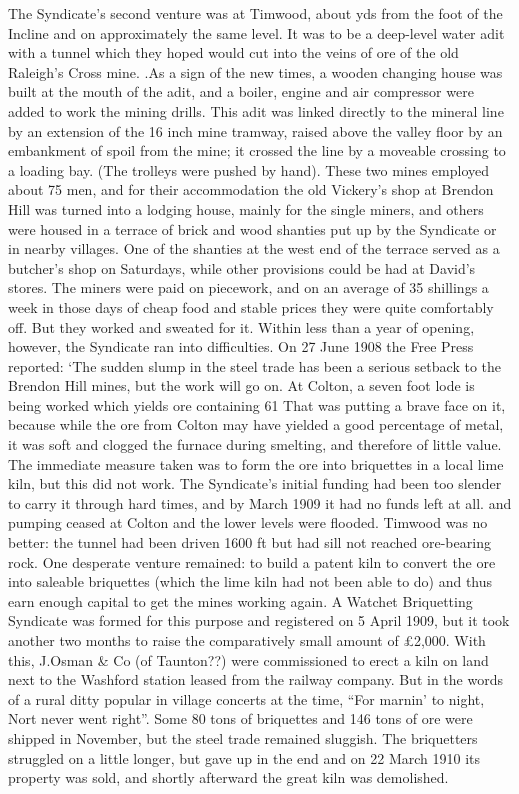 \documentclass[11pt]{book}
\begin{document}
   The Syndicate’s second venture was at Timwood, about       yds from the foot of the Incline and on approximately the same level. It was to be a deep-level water adit with a tunnel which they hoped would cut into the veins of ore of the old Raleigh’s Cross mine. .As a sign of the new times, a wooden changing house was built at the mouth of the adit, and a boiler, engine and air compressor were added to work the mining drills. This adit was linked directly to the mineral line by an extension of the 16 inch mine tramway, raised above the valley floor by an embankment of spoil from the mine; it crossed the line by a moveable crossing to a loading bay. (The trolleys were pushed by hand).
    These two mines employed about 75 men, and for their accommodation the old Vickery’s shop at Brendon Hill was turned into a lodging house, mainly for the single miners, and others were housed in a terrace of brick and wood shanties put up by the Syndicate or in nearby villages. One of the shanties at the west end of the terrace served as a butcher’s shop on Saturdays, while other provisions could be had at David’s stores. The miners were paid on piecework, and on an average of 35 shillings a week in those days of cheap food and stable prices they were quite comfortably off. But they worked and sweated for it.
  Within less than a year of opening, however, the Syndicate ran into difficulties. On 27 June 1908 the Free Press reported:
    ‘The sudden slump in the steel trade has been a serious setback to the Brendon Hill mines, but the work will go on.  At Colton, a seven foot lode is being worked which yields ore containing 61%
   That was putting a brave face on it, because while the ore from Colton may have yielded a good percentage of metal, it was soft and clogged the furnace during smelting, and therefore of little value. The immediate measure taken was to form the ore into briquettes in a local lime kiln, but this did not work.  The Syndicate’s initial funding had been too slender to carry it through hard times, and by March 1909 it had no funds left at all. and pumping ceased at Colton and the lower levels were flooded. Timwood was no better: the tunnel had been driven 1600 ft but had sill not reached ore-bearing rock.
   One desperate venture remained: to build a patent kiln to convert the ore into saleable briquettes (which the lime kiln had not been able to do) and thus earn enough capital to get the mines working again. A Watchet Briquetting Syndicate was formed for this purpose and registered on 5 April 1909, but it took another two months to raise the comparatively small amount of £2,000. With this,  J.Osman \& Co (of Taunton??) were commissioned to erect a kiln on land next to the Washford station leased from the railway company. But in the words of a rural ditty popular in village concerts at the time, “For marnin’ to night, Nort never went right”. Some 80 tons of briquettes and 146 tons of ore were shipped in November, but the steel trade remained sluggish. The briquetters struggled on a little longer, but gave up in the end and on 22 March 1910 its property was sold, and shortly afterward the great kiln was demolished. 
\end{document}
